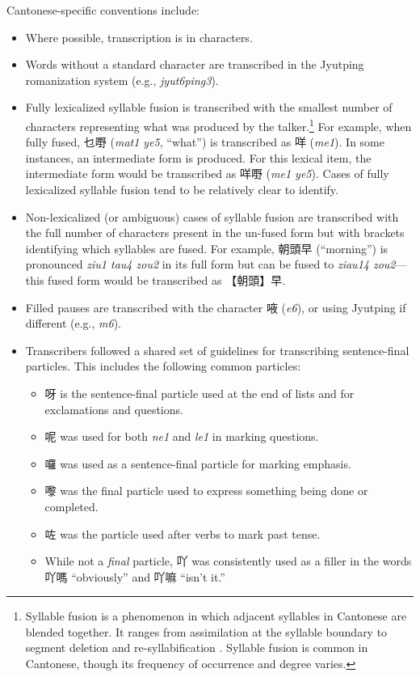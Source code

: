 Cantonese-specific conventions include:
\begin{itemize}
 \item Where possible, transcription is in characters.
 \item Words without a standard character are transcribed in the Jyutping romanization system (e.g., \textit{jyut6ping3}).
 \item Fully lexicalized syllable fusion is transcribed with the smallest number of characters representing what was produced by the talker.\footnote{Syllable fusion is a phenomenon in which adjacent syllables in Cantonese are blended together. It ranges from assimilation at the syllable boundary to segment deletion and re-syllabification \citep{wong_2006_fusion}. Syllable fusion is common in Cantonese, though its frequency of occurrence and degree varies.} For example, when fully fused, 乜嘢 (\textit{mat1 ye5}, ``what'') is transcribed as 咩 (\textit{me1}). In some instances, an intermediate form is produced. For this lexical item, the intermediate form would be transcribed as 咩嘢 (\textit{me1 ye5}). Cases of fully lexicalized syllable fusion tend to be relatively clear to identify.
 \item Non-lexicalized (or ambiguous) cases of syllable fusion are transcribed with the full number of characters present in the un-fused form but with brackets identifying which syllables are fused. For example,  朝頭早 (``morning'') is pronounced \textit{ziu1 tau4 zou2} in its full form but can be fused to \textit{ziau14 zou2}---this fused form would be transcribed as 【朝頭】早. 
 \item Filled pauses are transcribed with the character 㖡 (\textit{e6}), or using Jyutping if different (e.g., \textit{m6}). 
 \item Transcribers followed a shared set of guidelines for transcribing sentence-final particles. This includes the following common particles:
    \begin{itemize}
      \item 呀 is the sentence-final particle used at the end of lists and for exclamations and questions.
      \item 呢 was used for both \textit{ne1} and \textit{le1} in marking questions.
      \item 囉 was used as a sentence-final particle for marking emphasis.
      \item 嚟 was the final particle used to express something being done or completed.
      \item 咗 was the particle used after verbs to mark past tense.
      \item While not a \textit{final} particle, 吖 was consistently used as a filler in the words 吖嗎 ``obviously'' and 吖嘛 ``isn't it.''
    \end{itemize}
\end{itemize}

